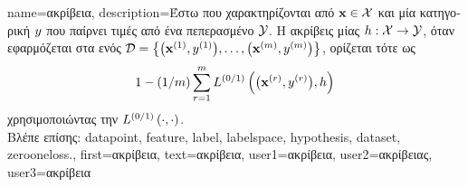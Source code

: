 {name={\foreignlanguage{greek}{ακρίβεια}},
	description={\foreignlanguage{greek}{Έστω}  
		\foreignlanguage{greek}{που χαρακτηρίζονται από}  ${\bf x} \in \mathcal{X}$ 
		\foreignlanguage{greek}{και μία κατηγορική} 
		$y$ \foreignlanguage{greek}{που παίρνει τιμές από ένα πεπερασμένο}  $\mathcal{Y}$. 
		\foreignlanguage{greek}{Η ακρίβεις μίας}  
		$h: \mathcal{X} \rightarrow \mathcal{Y}$, \foreignlanguage{greek}{όταν εφαρμόζεται στα}  
		 \foreignlanguage{greek}{ενός}  
		$\mathcal{D} = \big\{ \big({\bf x}^{(1)}, y^{(1)} \big), \ldots, \big({\bf x}^{(m)},y^{(m)}\big) \big\}$, 
		\foreignlanguage{greek}{ορίζεται τότε ως} $$1 - (1/m)\sum_{r=1}^{m} L^{(0/1)}\left(\big({\bf x}^{(r)},y^{(r)}\big),h \right)$$ \foreignlanguage{greek}{χρησιμοποιώντας την}  $L^{(0/1)}\left(\cdot,\cdot \right)$.\\
		\foreignlanguage{greek}{Βλέπε επίσης:} \gls{datapoint}, \gls{feature}, \gls{label}, \gls{labelspace}, \gls{hypothesis}, \gls{dataset}, \gls{zerooneloss}.},
	first={\foreignlanguage{greek}{ακρίβεια}},
	text={\foreignlanguage{greek}{ακρίβεια}},
	user1={\foreignlanguage{greek}{ακρίβεια}}, %
	user2={\foreignlanguage{greek}{ακρίβειας}}, %
	user3={\foreignlanguage{greek}{ακρίβεια}} %
}

